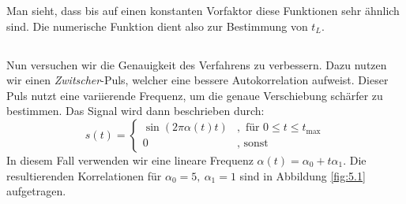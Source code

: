 \documentclass[ngerman]{scrartcl}
\begin{document}
Man sieht, dass bis auf einen konstanten Vorfaktor diese Funktionen sehr \"ahnlich sind.
Die numerische Funktion dient also zur Bestimmung von $t_L$.
\subsection{}
Nun versuchen wir die Genauigkeit des Verfahrens zu verbessern.
Dazu nutzen wir einen \emph{Zwitscher}-Puls, welcher eine bessere Autokorrelation aufweist.
Dieser Puls nutzt eine variierende Frequenz, um die genaue Verschiebung sch\"arfer zu bestimmen.
Das Signal wird dann beschrieben durch:
\begin{equation*}
s(t)=\left\{\begin{array}{ll}
\sin (2 \pi \alpha(t) t)&,\text { für } 0 \leq t \leq t_{\max } \\
0& ,\text { sonst }
\end{array}\right.
\end{equation*}
In diesem Fall verwenden wir eine lineare Frequenz $\alpha(t)=\alpha_0+t\alpha_1$.
Die resultierenden Korrelationen f\"ur $\alpha_0=5,~\alpha_1=1$ sind in Abbildung \ref{fig:5.1} aufgetragen.
\end{document}
